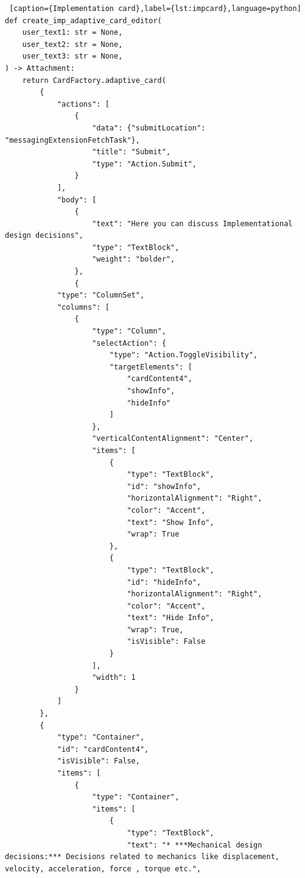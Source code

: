 \begin{lstlisting} [caption={Implementation card},label={lst:impcard},language=python]
def create_imp_adaptive_card_editor(
    user_text1: str = None,
    user_text2: str = None,
    user_text3: str = None,
) -> Attachment:
    return CardFactory.adaptive_card(
        {
            "actions": [
                {
                    "data": {"submitLocation": "messagingExtensionFetchTask"},
                    "title": "Submit",
                    "type": "Action.Submit",
                }
            ],
            "body": [
                {
                    "text": "Here you can discuss Implementational design decisions",
                    "type": "TextBlock",
                    "weight": "bolder",
                },
                {
            "type": "ColumnSet",
            "columns": [
                {
                    "type": "Column",
                    "selectAction": {
                        "type": "Action.ToggleVisibility",
                        "targetElements": [
                            "cardContent4",
                            "showInfo",
                            "hideInfo"
                        ]
                    },
                    "verticalContentAlignment": "Center",
                    "items": [
                        {
                            "type": "TextBlock",
                            "id": "showInfo",
                            "horizontalAlignment": "Right",
                            "color": "Accent",
                            "text": "Show Info",
                            "wrap": True
                        },
                        {
                            "type": "TextBlock",
                            "id": "hideInfo",
                            "horizontalAlignment": "Right",
                            "color": "Accent",
                            "text": "Hide Info",
                            "wrap": True,
                            "isVisible": False
                        }
                    ],
                    "width": 1
                }
            ]
        },
        {
            "type": "Container",
            "id": "cardContent4",
            "isVisible": False,
            "items": [
                {
                    "type": "Container",
                    "items": [
                        {
                            "type": "TextBlock",
                            "text": "* ***Mechanical design decisions:*** Decisions related to mechanics like displacement, velocity, acceleration, force , torque etc.",

\end{lstlisting}
